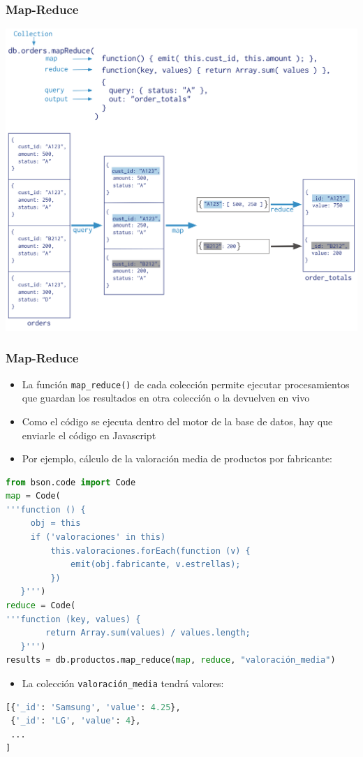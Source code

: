 \documentclass[14pt]{beamer}
\begin{document}
\begin{frame}
  \frametitle{Map-Reduce}
  \centering\includegraphics[height=.85\textheight]{img/mongo-map-reduce}
\end{frame}

\begin{frame}
  \frametitle{Map-Reduce}
  \begin{itemize}
  \item La función {\tt map\_reduce()} de cada colección permite ejecutar
    procesamientos que guardan los resultados en otra colección o la
    devuelven en vivo
  \item Como el código se ejecuta dentro del motor de la base de datos, hay
    que enviarle el código en Javascript
  \item Por ejemplo, cálculo de la valoración media de productos por
    fabricante:

  \end{itemize}

\framebreak
\begin{lstlisting}[language=Python]
from bson.code import Code
map = Code(
'''function () {
     obj = this
     if ('valoraciones' in this)
         this.valoraciones.forEach(function (v) {
             emit(obj.fabricante, v.estrellas);
         })
   }''')
reduce = Code(
'''function (key, values) {
        return Array.sum(values) / values.length;
   }''')
results = db.productos.map_reduce(map, reduce, "valoración_media")
\end{lstlisting}

\framebreak

\begin{itemize}
\item La colección {\tt valoración\_media} tendrá valores:
\end{itemize}

\begin{lstlisting}[language=Python]
[{'_id': 'Samsung', 'value': 4.25},
 {'_id': 'LG', 'value': 4},
 ...
]
\end{lstlisting}

\end{frame}
\end{document}

